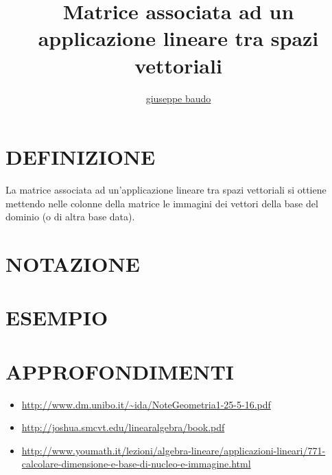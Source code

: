 \documentclass[a4paper,10pt]{article}
\title{Matrice associata ad un applicazione lineare tra spazi vettoriali}
\author{\href{http://www.baudo.hol.es}{giuseppe baudo}}
\begin{document}
\maketitle

\section{DEFINIZIONE}
La matrice associata ad un'applicazione lineare tra spazi vettoriali si ottiene mettendo nelle colonne della matrice
le immagini dei vettori della base del dominio (o di altra base data).

\section{NOTAZIONE}

\section{ESEMPIO}

\section{APPROFONDIMENTI}
\begin{itemize}
 \item \url{http://www.dm.unibo.it/~ida/NoteGeometria1-25-5-16.pdf}
 \item \url{http://joshua.smcvt.edu/linearalgebra/book.pdf}
 \item \url{http://www.youmath.it/lezioni/algebra-lineare/applicazioni-lineari/771-calcolare-dimensione-e-base-di-nucleo-e-immagine.html}
\end{itemize}
\end{document}
